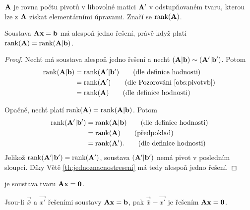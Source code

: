 \begin{definition}
     $\mathbf{A}$ je rovna počtu pivotů v libovolné 
    matici $\mathbf{A'}$ v odstupňovaném tvaru, kterou lze z $\mathbf{A}$ získat
    elementárními úpravami. Značí se $\mathop{\mathrm{rank}}(\mathbf{A})$.
\end{definition}

\begin{theorem}
    Soustava $\mathbf{A}\mathbf{x} = \mathbf{b}$ má alespoň jedno řešení, právě když
    platí $\mathop{\mathrm{rank}}(\mathbf{A}) = \mathop{\mathrm{rank}}(\mathbf{A}|\mathbf{b})$.
\end{theorem}

\begin{proof}
    Nechť má soustava alespoň jedno řešení a nechť $(\mathbf{A}|\mathbf{b}) \sim
    (\mathbf{A'}|\mathbf{b'})$. Potom
    \begin{align*}
        \rank(\mat{A}|\vec{b}) &= 
            \rank(\mat{A'}|\vec{b'}) \tag{dle definice hodnosti} \\
            &= \rank(\mat{A'}) \tag{dle Pozorování \ref{obs:pivotvb}} \\
            &= \rank(\mat{A}) \tag{dle definice hodnosti}
    \end{align*}

    Opačně, nechť platí $\mathop{\mathrm{rank}}(\mathbf{A}) = \mathop{\mathrm{rank}}(\mathbf{A}|\mathbf{b})$. Potom
    \begin{align*}
        \mathop{\mathrm{rank}}(\mathbf{A'}|\mathbf{b'}) &=
            \mathop{\mathrm{rank}}(\mathbf{A}|\mathbf{b}) \tag{dle definice hodnosti} \\
            &= \mathop{\mathrm{rank}}(\mathbf{A}) \tag{předpoklad} \\
            &= \mathop{\mathrm{rank}}(\mathbf{A'}). \tag{dle definice hodnosti}
    \end{align*}
    Jelikož $\mathop{\mathrm{rank}}(\mathbf{A'}|\mathbf{b'}) = \mathop{\mathrm{rank}}(\mathbf{A'})$, soustava
    $(\mathbf{A'}|\mathbf{b'})$ nemá pivot v posledním sloupci. Díky Větě
    \ref{th:jednoznacnostreseni} má tedy alespoň jedno řešení.
\end{proof}

\begin{definition}
     je soustava tvaru 
        $\mathbf{A}\mathbf{x} = \mathbf{0}$.
\end{definition}

\begin{observation}
    \label{obs:resenihomogennisoustavy}
    Jsou-li $\vec{\bar{x}}$ a $\vec{x'}$ řešeními soustavy $\mathbf{A}\mathbf{x} =
    \mathbf{b}$, pak $\vec{\bar{x}} - \vec{x'}$ je řešením $\mathbf{A}\mathbf{x} =
    \mathbf{0}$.
\end{observation}

